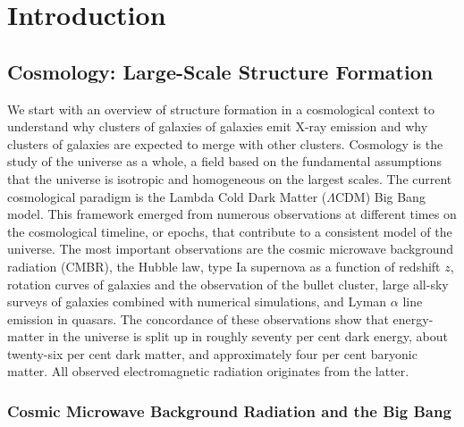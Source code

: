 \documentclass[MScProj_TLRH_ClusterEnergy.tex]{subfiles}
\begin{document}
\chapter{Introduction}
\label{sec:introduction}

\section{Cosmology: Large-Scale Structure Formation}
\label{sec:structure}

We start with an overview of structure formation in a cosmological context to 
understand why clusters of galaxies of galaxies emit X-ray emission and why
clusters of galaxies are expected to merge with other clusters. Cosmology is the 
study of the universe as a whole, a field based on the fundamental assumptions 
that the universe is isotropic and homogeneous on the largest scales. The current 
cosmological paradigm is the Lambda Cold Dark Matter ($\Lambda$CDM) Big Bang 
model. This framework emerged from numerous observations at different times on 
the cosmological timeline, or epochs, that contribute to a consistent model 
of the universe. The most important observations are the cosmic microwave 
background radiation (CMBR), the Hubble law, type Ia supernova as a function of
redshift $z$, rotation curves of galaxies and the observation of the bullet cluster,
large all-sky surveys of galaxies combined with numerical simulations, and Lyman
$\alpha$ line emission in quasars. The concordance of these observations show 
that energy-matter in the universe is split up in roughly seventy per cent dark 
energy, about twenty-six per cent dark matter, and approximately four per cent 
baryonic matter. All observed electromagnetic radiation originates from the latter.


\subsection*{Cosmic Microwave Background Radiation and the Big Bang}
\label{sec:bigbang}
\end{document}
